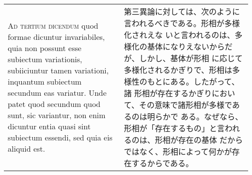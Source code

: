 \documentclass[10pt]{jsarticle} %
\begin{document}
\begin{longtable}{p{21em}p{21em}}
\\

{\scshape Ad tertium dicendum} quod formae dicuntur invariabiles, quia
non possunt esse subiectum variationis, subiiciuntur tamen variationi,
inquantum subiectum secundum eas variatur. Unde patet quod secundum quod
sunt, sic variantur, non enim dicuntur entia quasi sint subiectum
essendi, sed quia eis aliquid est.

&

第三異論に対しては、次のように言われるべきである。形相が多様化されえな
いと言われるのは、多様化の基体になりえないからだが、しかし、基体が形相
に応じて多様化されるかぎりで、形相は多様性のもとにある。したがって、諸
形相が存在するかぎりにおいて、その意味で諸形相が多様であるのは明らかで
ある。なぜなら、形相が「存在するもの」と言われるのは、形相が存在の基体
だからではなく、形相によって何かが存在するからである。

\end{longtable}
\end{document}

